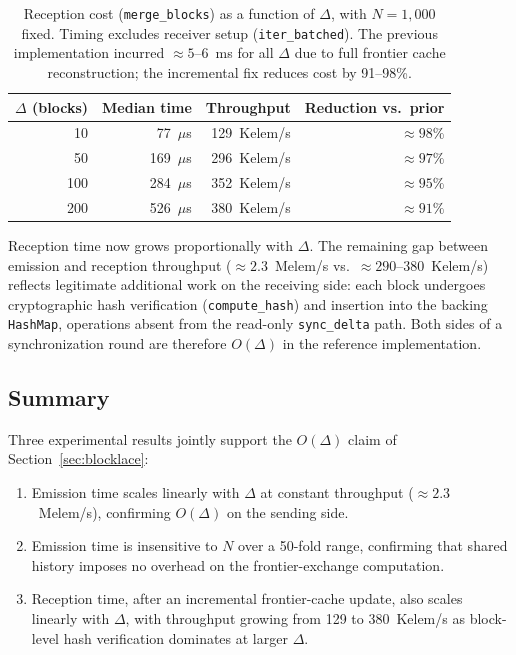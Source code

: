 \documentclass[12pt]{article}
\begin{document}
	\begin{table}[h]
		\centering
		\caption{Reception cost (\texttt{merge\_blocks}) as a function of
			$\Delta$, with $N = 1{,}000$ fixed. Timing excludes receiver
			setup (\texttt{iter\_batched}). The previous implementation
			incurred ${\approx}5$--$6$~ms for all $\Delta$ due to full
			frontier cache reconstruction; the incremental fix reduces
			cost by 91--98\%.}
		\label{tab:bench3}
		\small
		\begin{tabular}{@{} r r r r @{}}
			\toprule
			$\Delta$ (blocks) & Median time & Throughput & Reduction vs.\ prior \\
			\midrule
			10  & \phantom{0}77~$\mu$s  & 129~Kelem/s  & ${\approx}98\%$ \\
			50  & 169~$\mu$s            & 296~Kelem/s  & ${\approx}97\%$ \\
			100 & 284~$\mu$s            & 352~Kelem/s  & ${\approx}95\%$ \\
			200 & 526~$\mu$s            & 380~Kelem/s  & ${\approx}91\%$ \\
			\bottomrule
		\end{tabular}
	\end{table}
	
	Reception time now grows proportionally with $\Delta$. The remaining
	gap between emission and reception throughput (${\approx}2.3$~Melem/s
	vs.\ ${\approx}290$--$380$~Kelem/s) reflects legitimate additional
	work on the receiving side: each block undergoes cryptographic hash
	verification (\texttt{compute\_hash}) and insertion into the backing
	\texttt{HashMap}, operations absent from the read-only
	\texttt{sync\_delta} path. Both sides of a synchronization round are
	therefore $O(\Delta)$ in the reference implementation.
	
	\subsection{Summary}
	
	Three experimental results jointly support the $O(\Delta)$ claim of
	Section~\ref{sec:blocklace}:
	
	\begin{enumerate}[itemsep=2pt]
		\item Emission time scales linearly with $\Delta$ at constant
		throughput (${\approx}2.3$~Melem/s), confirming $O(\Delta)$ on
		the sending side.
		\item Emission time is insensitive to $N$ over a 50-fold range,
		confirming that shared history imposes no overhead on the
		frontier-exchange computation.
		\item Reception time, after an incremental frontier-cache update,
		also scales linearly with $\Delta$, with throughput growing from
		129 to 380~Kelem/s as block-level hash verification dominates at
		larger $\Delta$.
	\end{enumerate}
\end{document}
